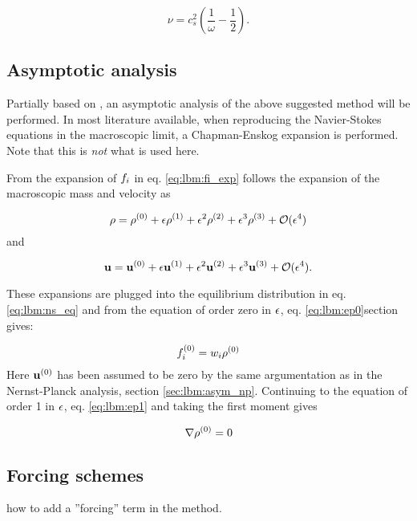 \begin{equation}
\nu = c_s^2\left( \frac{1}{\omega} - \frac{1}{2} \right).
\end{equation}

\subsection{Asymptotic analysis}\label{sec:lbm:asym_ns}
Partially based on \cite{junk-asym}, an asymptotic analysis of the
above suggested method will be performed. In most literature
available, when reproducing the Navier-Stokes equations in the
macroscopic limit, a Chapman-Enskog expansion is performed. Note that
this is \emph{not} what is used here.

From the expansion of $f_i$ in eq. \eqref{eq:lbm:fi_exp} follows the
expansion of the macroscopic mass and velocity as

\begin{equation}\label{eq:lbm:ns_rho_exp}
\rho = \rho^{(0)} + \epsilon\rho^{(1)} + \epsilon^2\rho^{(2)} + \epsilon^3\rho^{(3)} +
\mathcal{O}(\epsilon^4)
\end{equation} 
and

\begin{equation}
\mathbf{u} = \mathbf{u}^{(0)} + \epsilon\mathbf{u}^{(1)} + \epsilon^2\mathbf{u}^{(2)} + \epsilon^3\mathbf{u}^{(3)} + \mathcal{O}(\epsilon^4).
\end{equation}

These expansions are plugged into the equilibrium distribution in
eq. \eqref{eq:lbm:ns_eq} and from the equation of order zero in $\epsilon$,
eq. \eqref{eq:lbm:ep0}section gives:

\begin{equation}
  f_i^{(0)} = w_i \rho^{(0)}
\end{equation}
Here $\mathbf{u}^{(0)}$ has been assumed to be zero by the same argumentation as
in the Nernst-Planck analysis, section
\ref{sec:lbm:asym_np}. Continuing to the equation of order 1 in $\epsilon$,
eq. \eqref{eq:lbm:ep1} and taking the first moment gives

\begin{equation}
\nabla \rho^{(0)} = 0
\end{equation}



\subsection{Forcing schemes}\label{sec:lbm:forces}
how to add a ''forcing'' term in the method.

